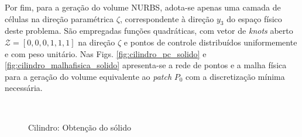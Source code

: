 \documentclass[tese_patricia]{subfiles}
\begin{document}
Por fim, para a geração do volume NURBS, adota-se apenas uma camada de células na direção paramétrica $\zeta$, correspondente à direção $y_3$ do espaço físico deste problema. São empregadas funções quadráticas, com vetor de \textit{knots} aberto $\mathcal{Z} = \left[0,0,0,1,1,1\right]$ na direção $\zeta$ e pontos de controle distribuídos uniformemente e com peso unitário. Nas Figs. \ref{fig:cilindro_pc_solido} e \ref{fig:cilindro_malhafisica_solido} apresenta-se a rede de pontos e a malha física para a geração do volume equivalente ao \textit{patch} $P_0$ com a discretização mínima necessária.

\begin{figure}[!t]
	\centering
	   \ \ 
	\caption{Cilindro: Obtenção do sólido}
	\label{fig:cilindro_geo2}
\end{figure}
\end{document}
